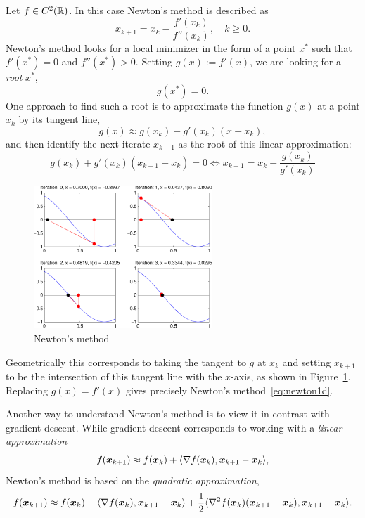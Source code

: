 \begin{example}
 Let $f\in C^2(\mathbb{R})$. In this case Newton's method is described as
 \begin{equation}\label{eq:newton1d}
  x_{k+1} = x_k-\frac{f'(x_k)}{f''(x_k)}, \quad k\geq 0.
 \end{equation}
Newton's method looks for a local minimizer in the form of a point $x^*$ such that $f'(x^*)=0$ and $f''(x^*)>0$. Setting $g(x):=f'(x)$, we are looking for a {\em root} $x^*$,
\begin{equation*}
 g(x^*)=0.
\end{equation*}
One approach to find such a root is to approximate the function $g(x)$ at a point $x_k$ by its tangent line,
\begin{equation*}
 g(x) \approx g(x_k)+g'(x_k)(x-x_k),
\end{equation*}
and then identify the next iterate $x_{k+1}$ as the root of this linear approximation:
\begin{equation*}
 g(x_k)+g'(x_k)(x_{k+1}-x_k)=0 \Longleftrightarrow x_{k+1} = x_k-\frac{g(x_k)}{g'(x_k)} 
\end{equation*}

\begin{figure}[h!]
\centering
 \includegraphics[width=0.6\textwidth]{images/newton-crop.pdf}
\caption{Newton's method}\label{fig:newton}
\end{figure}

Geometrically this corresponds to taking the tangent to $g$ at $x_k$ and setting $x_{k+1}$ to be the intersection of this tangent line with the $x$-axis, as shown in Figure~\ref{fig:newton}.
Replacing $g(x)=f'(x)$ gives precisely Newton's method~\eqref{eq:newton1d}.
\end{example}

Another way to understand Newton's method is to view it in contrast with gradient descent. While gradient descent corresponds to working with a {\em linear approximation}
\begin{equation*}
 f(\bm{x}_{k+1}) \approx f(\bm{x}_k)+\langle {\nabla f(\bm{x}_k)}, {\bm{x}_{k+1}-\bm{x}_k} \rangle,
\end{equation*}
Newton's method is based on the {\em quadratic approximation},
\begin{equation*}
 f(\bm{x}_{k+1}) \approx f(\bm{x}_k)+\langle {\nabla f(\bm{x}_k)}, {\bm{x}_{k+1}-\bm{x}_k} \rangle+\frac{1}{2}\langle {\nabla^2 f(\bm{x}_k)(\bm{x}_{k+1}-\bm{x}_k)}, {\bm{x}_{k+1}-\bm{x}_k} \rangle.
\end{equation*}


